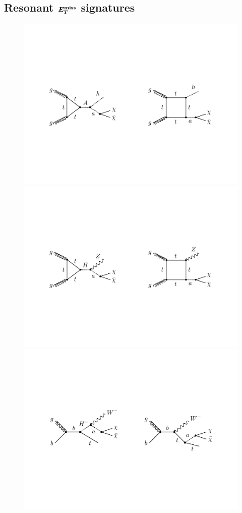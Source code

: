 \documentclass[review]{elsarticle}
\def\bm#1{\mbox{\boldmath$#1$\unboldmath}}
\begin{document}
\subsection[Resonant $E_T^{\rm miss}$ signatures]{Resonant $\bm{E_T^{\rm miss}}$ signatures}
\label{sec:resonant}

\begin{figure}[t!]
\centering
\includegraphics[width=.8\textwidth]{hmet.pdf}

\vspace{4mm}

\includegraphics[width=.8\textwidth]{zmet.pdf}

\vspace{5mm}

\includegraphics[width=.8\textwidth]{twmet.pdf}


\end{figure}
\end{document}
